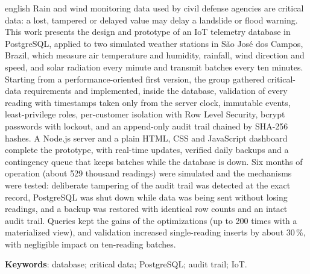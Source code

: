 \begin{resumo}[Abstract]
\begin{otherlanguage*}{english}
Rain and wind monitoring data used by civil defense agencies are critical data: a lost, tampered or delayed value may delay a landslide or flood warning. This work presents the design and prototype of an IoT telemetry database in PostgreSQL, applied to two simulated weather stations in São José dos Campos, Brazil, which measure air temperature and humidity, rainfall, wind direction and speed, and solar radiation every minute and transmit batches every ten minutes. Starting from a performance-oriented first version, the group gathered critical-data requirements and implemented, inside the database, validation of every reading with timestamps taken only from the server clock, immutable events, least-privilege roles, per-customer isolation with Row Level Security, bcrypt passwords with lockout, and an append-only audit trail chained by SHA-256 hashes. A Node.js server and a plain HTML, CSS and JavaScript dashboard complete the prototype, with real-time updates, verified daily backups and a contingency queue that keeps batches while the database is down. Six months of operation (about 529 thousand readings) were simulated and the mechanisms were tested: deliberate tampering of the audit trail was detected at the exact record, PostgreSQL was shut down while data was being sent without losing readings, and a backup was restored with identical row counts and an intact audit trail. Queries kept the gains of the optimizations (up to 200 times with a materialized view), and validation increased single-reading inserts by about 30\,\%, with negligible impact on ten-reading batches.

\vspace{\onelineskip}
\noindent\textbf{Keywords}: database; critical data; PostgreSQL; audit trail; IoT.
\end{otherlanguage*}
\end{resumo}
